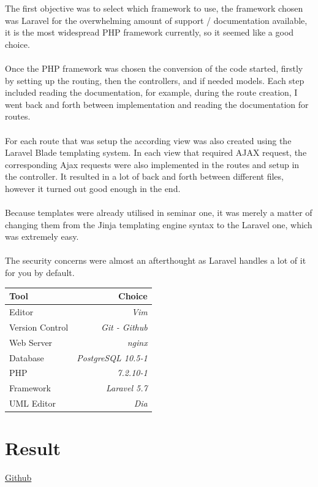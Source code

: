 \documentclass[a4paper]{scrartcl}
\begin{document}
The first objective was to select which framework to use, the framework chosen was
Laravel for the overwhelming amount of support / documentation available, it is the most
widespread PHP framework currently, so it seemed like a good choice.
\\\\
\noindent
Once the PHP framework was chosen the conversion of the code started, firstly
by setting up the routing, then the controllers, and if needed models. Each step
included reading the documentation, for example, during the route creation, I went
back and forth between implementation and reading the documentation for routes.
\\\\
\noindent
For each route that was setup the according view was also created using the
Laravel Blade templating system. In each view that required AJAX request, the
corresponding Ajax requests were also implemented in the routes and setup in the
controller. It resulted in a lot of back and forth between different files,
however it turned out good enough in the end. 
\\\\
\noindent
Because templates were already utilised in seminar one, it was merely a matter
of changing them from the Jinja templating engine syntax to the Laravel one, which
was extremely easy.
\\\\
The security concerns were almost an afterthought as Laravel handles a lot of
it for you by default.
\begin{center}
    \begin{tabular}{  l | r }
    Tool & Choice \\ 
    \hline
    Editor & \textit{Vim}\\
    Version Control & \textit{Git - Github}\\
    Web Server & \textit{nginx}\\
    Database & \textit{PostgreSQL 10.5-1}\\
    PHP & \textit{7.2.10-1} \\
    Framework & \textit{Laravel 5.7}\\
    UML Editor & \textit{Dia}\\
    \end{tabular}
\end{center}
\section{Result}
\href{https://github.com/linus-dev/KTH-Projects/tree/master/ID1354/3/laravel}
{Github}
\end{document}

